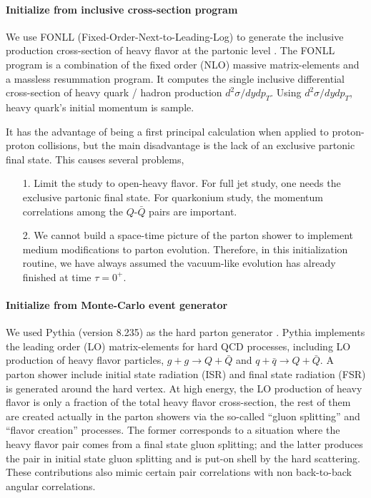 \paragraph{Initialize from inclusive cross-section program}
We use FONLL (Fixed-Order-Next-to-Leading-Log) to generate the inclusive production cross-section of heavy flavor at the partonic level \cite{Cacciari:1998it}.
The FONLL program is a combination of the fixed order (NLO) massive matrix-elements and a massless resummation program.
It computes the single inclusive differential cross-section of heavy quark / hadron production $d^2\sigma/dydp_T$.
Using $d^2\sigma/dydp_T$, heavy quark's initial momentum is sample.

It has the advantage of being a first principal calculation when applied to proton-proton collisions, but the main disadvantage is the lack of an exclusive partonic final state.
This causes several problems,
\begin{itemize}
\item[1.] Limit the study to open-heavy flavor.
For full jet study, one needs the exclusive partonic final state. For quarkonium study, the momentum correlations among the $Q$-$\bar{Q}$ pairs are important.
\item[2.] We cannot build a space-time picture of the parton shower to implement medium modifications to parton evolution. 
Therefore, in this initialization routine, we have always assumed the vacuum-like evolution has already finished at time $\tau=0^{+}$.
\end{itemize}

\paragraph{Initialize from Monte-Carlo event generator}
We used Pythia (version 8.235) as the hard parton generator \cite{Sjostrand:2014zea, Sjostrand:2006za}.
Pythia implements the leading order (LO) matrix-elements for hard QCD processes, including LO production of heavy flavor particles,
$g+g\rightarrow Q+\bar{Q}$ and $q+\bar{q}\rightarrow Q+\bar{Q}$.
A parton shower include initial state radiation (ISR) and final state radiation (FSR) is generated around the hard vertex.
At high energy, the LO production of heavy flavor is only a fraction of the total heavy flavor cross-section, the rest of them are created actually in the parton showers via the so-called ``gluon splitting'' and ``flavor creation'' processes.
The former corresponds to a situation where the heavy flavor pair comes from a final state gluon splitting; and the latter produces the pair in initial state gluon splitting and is put-on shell by the hard scattering.
These contributions also mimic certain pair correlations with non back-to-back angular correlations.

